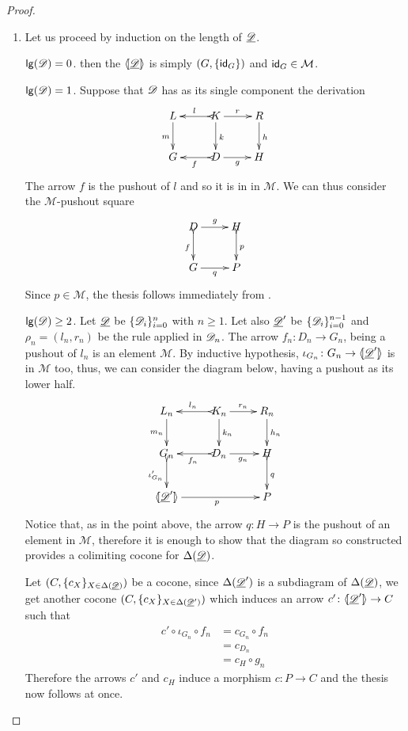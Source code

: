 \begin{proof}\begin{enumerate}
		\item Let us proceed by induction on the length of $\underline{\mathscr{D}}$.

	
	\smallskip \noindent $\mathsf{lg}(\mathscr{D})=0$. then the $\langle \hspace{-1.85pt}[ \underline{\mathscr{\mathscr{D}}}]\hspace{-1.85pt}\rangle$ is simply $(G, \{\mathsf{id}_{G}\})$ and $\mathsf{id}_{G}\in \mathcal{M}$.
	
	\smallskip \noindent$\mathsf{lg}(\mathscr{D})=1$. Suppose that $\mathscr{D}$ has as its single component the derivation
			\[\xymatrix{L \ar[d]_{m}& K \ar[d]^{k}\ar@{>->}[l]_{l} \ar[r]^{r} & R \ar[d]^{h} \\G& \ar@{>->}[l]^{f} D \ar[r]_{g}& H  \\}\]
			The arrow $f$ is  the pushout of $l$ and so it is in in $\mathcal{M}$. We can thus consider the $\mathcal{M}$-pushout square
			\[\xymatrix{D \ar@{>->}[d]_{f} \ar[r]^{g} & H \ar@{>->}[d]^{p} \\G \ar[r]_{q}& P }\]
			Since $p\in \mathcal{M}$, the thesis follows immediately from . 
	
	\smallskip \noindent$\mathsf{lg}(\mathscr{D})\geq 2$. Let $\underline{\mathscr{D}}$ be $\{\mathscr{D}_i\}_{i=0}^n$ with $n\geq 1$. Let also $\underline{\mathscr{D}}'$ be $\{\mathscr{D}_i\}^{n-1}_{i=0}$ and $\rho_n=(l_n, r_n)$ be the rule applied in $\mathscr{D}_n$. The arrow $f_n\colon D_n\to G_n$, being a pushout of $l_n$ is an element $\mathcal{M}$. By inductive hypothesis, $\iota_{G_{n}}\colon G_{n}\to \langle \hspace{-1.85pt}[ \underline{\mathscr{D}}']\hspace{-1.85pt}\rangle$ is in $\mathcal{M}$ too, thus, we can consider the diagram below, having a pushout as its lower half.
			\[\xymatrix{L_n \ar[d]_{m_{n}}& K_{n} \ar[d]^{k_{n}}\ar@{>->}[l]_{l_{n}} \ar[r]^{r_{n}} & R_{n} \ar[d]^{h_n} \\G_{n} \ar@{>->}[d]_{\iota'_{G_{n}}}& \ar@{>->}[l]^{f_n} D_n \ar[r]_{g_n}& H  \ar@{>->}[d]^{q}\\ \lpro \der{D}' \ar[rr]_{p}\rpro && P}\] 
			Notice that, as in the point above, the arrow $q\colon H\to P$ is the pushout of an element in $\mathcal{M}$, therefore it is enough to show that the diagram so constructed provides a colimiting cocone for $\Delta(\underline{\mathscr{D}})$.
			
			Let $(C, \{c_X\}_{X\in \Delta(\underline{\mathscr{D}})})$ be a cocone, since $\Delta(\underline{\mathscr{D}}')$ is a subdiagram of $\Delta(\underline{\mathscr{D}})$, we get another cocone $(C, \{c_X\}_{X\in \Delta(\underline{\mathscr{D}}')})$ which induces an arrow $c'\colon \langle \hspace{-1.85pt}[ \underline{\mathscr{D}}' ]\hspace{-1.85pt}\rangle \to C$ such that
			\begin{align*}
				c'\circ \iota_{G_n} \circ f_n &=c_{G_n} \circ f_n\\&= c_{D_n}\\&= c_{H}\circ g_n
			\end{align*}
			Therefore the arrows $c'$ and $c_H$ induce a morphism $c\colon P\to C$ and the thesis now follows at once.
		

\end{enumerate}
\end{proof}
